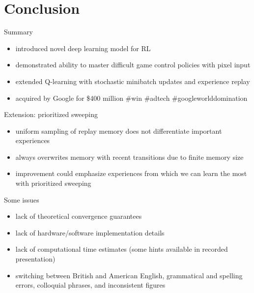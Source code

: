 \section{Conclusion}

\begin{frame}{Summary}
    \begin{itemize}\itemsep=12pt

        \item introduced novel deep learning model for RL

        \item demonstrated ability to master difficult game control policies with pixel input

        \item extended Q-learning with stochastic minibatch updates and experience replay

        \item \tiny{acquired by Google for \$400 million \#win \#adtech \#googleworlddomination}

    \end{itemize}
\end{frame}

\begin{frame}{Extension: prioritized sweeping}
    \begin{itemize}\itemsep=12pt

        \item uniform sampling of replay memory does not differentiate important experiences

        \item always overwrites memory with recent transitions due to finite memory size

        \item improvement could emphasize experiences from which we can learn the most with prioritized sweeping

    \end{itemize}
\end{frame}

\begin{frame}{Some issues}
    \begin{itemize}\itemsep=12pt

        \item lack of theoretical convergence guarantees

        \item lack of hardware/software implementation details

        \item lack of computational time estimates (some hints available in recorded presentation)

        \item \tiny{switching between British and American English, grammatical and spelling errors, colloquial phrases, and inconsistent figures}

    \end{itemize}
\end{frame}

